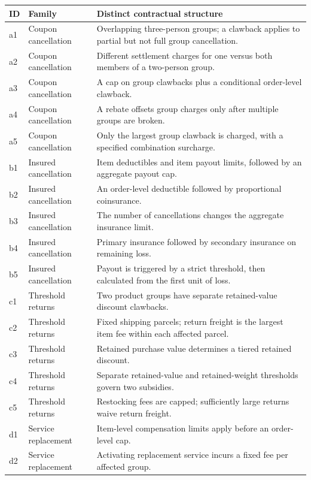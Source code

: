 \begin{table}[!tbp]
\centering\small
\begin{tabular}{llp{10.4cm}}
\toprule
ID & Family & Distinct contractual structure \\
\midrule
a1 & Coupon cancellation & Overlapping three-person groups; a clawback applies to partial but not full group cancellation.\\
a2 & Coupon cancellation & Different settlement charges for one versus both members of a two-person group.\\
a3 & Coupon cancellation & A cap on group clawbacks plus a conditional order-level clawback.\\
a4 & Coupon cancellation & A rebate offsets group charges only after multiple groups are broken.\\
a5 & Coupon cancellation & Only the largest group clawback is charged, with a specified combination surcharge.\\
\midrule
b1 & Insured cancellation & Item deductibles and item payout limits, followed by an aggregate payout cap.\\
b2 & Insured cancellation & An order-level deductible followed by proportional coinsurance.\\
b3 & Insured cancellation & The number of cancellations changes the aggregate insurance limit.\\
b4 & Insured cancellation & Primary insurance followed by secondary insurance on remaining loss.\\
b5 & Insured cancellation & Payout is triggered by a strict threshold, then calculated from the first unit of loss.\\
\midrule
c1 & Threshold returns & Two product groups have separate retained-value discount clawbacks.\\
c2 & Threshold returns & Fixed shipping parcels; return freight is the largest item fee within each affected parcel.\\
c3 & Threshold returns & Retained purchase value determines a tiered retained discount.\\
c4 & Threshold returns & Separate retained-value and retained-weight thresholds govern two subsidies.\\
c5 & Threshold returns & Restocking fees are capped; sufficiently large returns waive return freight.\\
\midrule
d1 & Service replacement & Item-level compensation limits apply before an order-level cap.\\
d2 & Service replacement & Activating replacement service incurs a fixed fee per affected group.\\

\end{tabular}
\end{table}
